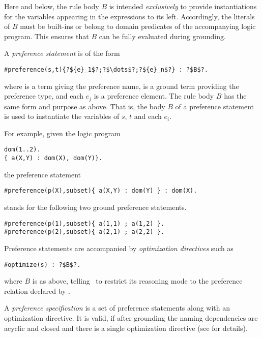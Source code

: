 \begin{note}
Here and below, 
the rule body $B$ is intended \emph{exclusively} to provide instantiations for the variables appearing in the expressions to its left.  
Accordingly, the literals of $B$ must be built-ins or belong to domain predicates of the accompanying logic program.
This ensures that $B$ can be fully evaluated during grounding.
\end{note}

A \emph{preference statement} is of the form
%
\begin{lstlisting}[numbers=none,escapechar=?]
#preference(s,t){?${e}_1$?;?$\dots$?;?${e}_n$?} : ?$B$?.
\end{lstlisting}
%
where  is a term giving the preference name, 
 is a ground term providing the preference type, 
and each $e_j$ is a preference element.
The rule body $B$ has the same form and purpose as above.
%
That is, the body $B$ of a preference statement is used to instantiate the variables of $s$, $t$ and each $e_i$.

For example, given the logic program 
\begin{lstlisting}[numbers=none]
dom(1..2).
{ a(X,Y) : dom(X), dom(Y)}.
\end{lstlisting}
the preference statement 
\begin{lstlisting}[numbers=none]
#preference(p(X),subset){ a(X,Y) : dom(Y) } : dom(X).
\end{lstlisting}
stands for the following two ground preference statements.
\begin{lstlisting}[numbers=none]
#preference(p(1),subset){ a(1,1) ; a(1,2) }.
#preference(p(2),subset){ a(2,1) ; a(2,2) }.
\end{lstlisting}

Preference statements are accompanied by 
\emph{optimization directives} such as
\begin{lstlisting}[numbers=none,escapechar=?]
#optimize(s) : ?$B$?.
\end{lstlisting}
where $B$ is as above, 
telling \asprin\ to restrict its reasoning mode to the preference relation declared by .
% 

A \emph{preference specification} is a set of preference statements along with an optimization directive.
It is valid, if after grounding the naming dependencies are acyclic and closed
and there is a single optimization directive
(see \cite{brderosc15a} for details).


